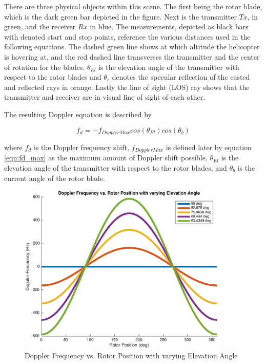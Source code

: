 There are three physical objects within this scene. The first being the rotor blade, which is the dark green bar depicted in the figure. Next is the transmitter $Tx$, in green, and the receiver $Rx$ in blue. The measurements, depicted as black bars with denoted start and stop points, reference the various distances used in the following equations. The dashed green line shows at which altitude the helicopter is hovering at, and the red dashed line transverses the transmitter and the center of rotation for the blades. $\theta_{El}$ is the elevation angle of the transmitter with respect to the rotor blades and $\theta_r$ denotes the specular reflection of the casted and reflected rays in orange. Lastly the line of sight (LOS) ray shows that the transmitter and receiver are in visual line of sight of each other.

The resulting Doppler equation is described by

\begin{equation}
	f_d = -f_{DopplerMax}cos(\theta_{El})cos(\theta_{b})
	\label{eq:dop_theory_blade}
\end{equation}

where $f_d$ is the Doppler frequency shift, $f_{DopplerMax}$ is defined later by equation \ref{eqn:fd_max} as the maximum amount of Doppler shift possible, $\theta_{El}$ is the elevation angle of the transmitter with respect to the rotor blades, and $\theta_{b}$ is the current angle of the rotor blade.

\begin{figure}
	\begin{center}
		\includegraphics[width=10cm]{images/background/2d_theoretical_doppler_profile.eps}
		\caption{Doppler Frequency vs. Rotor Position with varying Elevation Angle}
		\label{fig:2D_theoretical_doppler}
	\end{center}
\end{figure}

